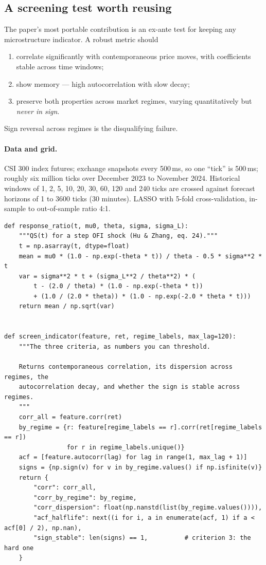 \documentclass[11pt]{article}
\begin{document}
\subsection{A screening test worth reusing}

The paper's most portable contribution is an ex-ante test for keeping any
microstructure indicator. A robust metric should
\begin{enumerate}[leftmargin=2em,itemsep=1pt]
\item correlate significantly with contemporaneous price moves, with
coefficients stable across time windows;
\item show memory --- high autocorrelation with slow decay;
\item preserve both properties across market regimes, varying quantitatively
but \emph{never in sign}.
\end{enumerate}
Sign reversal across regimes is the disqualifying failure.

\paragraph{Data and grid.} CSI 300 index futures; exchange snapshots every
500\,ms, so one ``tick'' is 500\,ms; roughly six million ticks over
December 2023 to November 2024. Historical windows of 1, 2, 5, 10, 20, 30, 60,
120 and 240 ticks are crossed against forecast horizons of 1 to 3600 ticks
(30 minutes). LASSO with 5-fold cross-validation, in-sample to out-of-sample
ratio 4:1.

\begin{lstlisting}[caption={Response-ratio curve and the regime-stability screen.}]
def response_ratio(t, mu0, theta, sigma, sigma_L):
    """QS(t) for a step OFI shock (Hu & Zhang, eq. 24)."""
    t = np.asarray(t, dtype=float)
    mean = mu0 * (1.0 - np.exp(-theta * t)) / theta - 0.5 * sigma**2 * t
    var = sigma**2 * t + (sigma_L**2 / theta**2) * (
        t - (2.0 / theta) * (1.0 - np.exp(-theta * t))
        + (1.0 / (2.0 * theta)) * (1.0 - np.exp(-2.0 * theta * t)))
    return mean / np.sqrt(var)


def screen_indicator(feature, ret, regime_labels, max_lag=120):
    """The three criteria, as numbers you can threshold.

    Returns contemporaneous correlation, its dispersion across regimes, the
    autocorrelation decay, and whether the sign is stable across regimes.
    """
    corr_all = feature.corr(ret)
    by_regime = {r: feature[regime_labels == r].corr(ret[regime_labels == r])
                 for r in regime_labels.unique()}
    acf = [feature.autocorr(lag) for lag in range(1, max_lag + 1)]
    signs = {np.sign(v) for v in by_regime.values() if np.isfinite(v)}
    return {
        "corr": corr_all,
        "corr_by_regime": by_regime,
        "corr_dispersion": float(np.nanstd(list(by_regime.values()))),
        "acf_halflife": next((i for i, a in enumerate(acf, 1) if a < acf[0] / 2), np.nan),
        "sign_stable": len(signs) == 1,          # criterion 3: the hard one
    }
\end{lstlisting}
\end{document}
